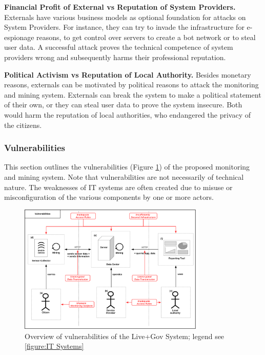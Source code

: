 \documentclass[runningheads,a4paper]{llncs}
\begin{document}
\textbf{Financial Profit of External vs Reputation of System Providers.}
Externals have various business models as optional foundation for attacks on System Providers.
For instance, they can try to invade the infrastructure for e-espionage reasons, to get control over servers to create a bot network or to steal user data. A successful attack proves the technical competence of system providers wrong and subsequently harms their professional reputation.


\textbf{Political Activism vs Reputation of Local Authority.}
Besides monetary reasons, externals can be motivated by political reasons to attack the monitoring and mining system.
Externals can break the system to make a political statement of their own,
or they can steal user data to prove the system insecure.
Both would harm the reputation of local authorities, who endangered the privacy of the citizens.


\subsubsection{Vulnerabilities}
\label{subsubsection:Vulnerabilities}
This section outlines the vulnerabilities (Figure \ref{figure:Live+Gov Vulnerabilities}) of the proposed monitoring and mining system.
Note that vulnerabilities are not necessarily of technical nature.
The weaknesses of IT systems are often created due to misuse or misconfiguration of the various components by one or more actors.

\begin{figure}
\centering
\includegraphics[width=0.8\textwidth]{diagrams/png/vulnerabilities.png}

\caption{Overview of vulnerabilities of the Live+Gov System; legend see \ref{figure:IT Systems} }
\label{figure:Live+Gov Vulnerabilities}
\end{figure}
\end{document}
